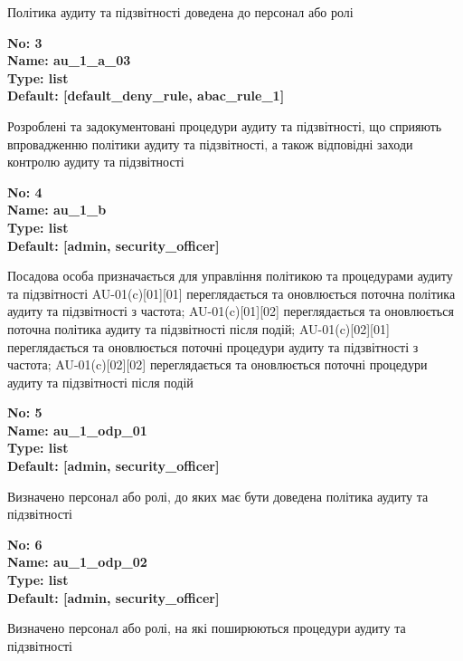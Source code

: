 \documentclass{article}
\begin{document}
{\footnotesize Політика аудиту та підзвітності доведена до персонал або ролі}


{\footnotesize\bfseries
No: 3\\
Name: au\_\allowbreak{}1\_\allowbreak{}a\_\allowbreak{}03\\
Type: list\\
Default: [\textquotedbl{}default\_\allowbreak{}deny\_\allowbreak{}rule\textquotedbl{}, \textquotedbl{}abac\_\allowbreak{}rule\_\allowbreak{}1\textquotedbl{}]
}

{\footnotesize Розроблені та задокументовані процедури аудиту та підзвітності, що сприяють впровадженню політики аудиту та підзвітності, а також відповідні заходи контролю аудиту та підзвітності}


{\footnotesize\bfseries
No: 4\\
Name: au\_\allowbreak{}1\_\allowbreak{}b\\
Type: list\\
Default: [\textquotedbl{}admin\textquotedbl{}, \textquotedbl{}security\_\allowbreak{}officer\textquotedbl{}]
}

{\footnotesize Посадова особа призначається для управління політикою та процедурами аудиту та підзвітності AU-01(c)[01][01] переглядається та оновлюється поточна політика аудиту та підзвітності з частота; AU-01(c)[01][02] переглядається та оновлюється поточна політика аудиту та підзвітності після подій; AU-01(c)[02][01] переглядається та оновлюється поточні процедури аудиту та підзвітності з частота; AU-01(c)[02][02] переглядається та оновлюється поточні процедури аудиту та підзвітності після подій}


{\footnotesize\bfseries
No: 5\\
Name: au\_\allowbreak{}1\_\allowbreak{}odp\_\allowbreak{}01\\
Type: list\\
Default: [\textquotedbl{}admin\textquotedbl{}, \textquotedbl{}security\_\allowbreak{}officer\textquotedbl{}]
}

{\footnotesize Визначено персонал або ролі, до яких має бути доведена політика аудиту та підзвітності}


{\footnotesize\bfseries
No: 6\\
Name: au\_\allowbreak{}1\_\allowbreak{}odp\_\allowbreak{}02\\
Type: list\\
Default: [\textquotedbl{}admin\textquotedbl{}, \textquotedbl{}security\_\allowbreak{}officer\textquotedbl{}]
}

{\footnotesize Визначено персонал або ролі, на які поширюються процедури аудиту та підзвітності}
\end{document}
